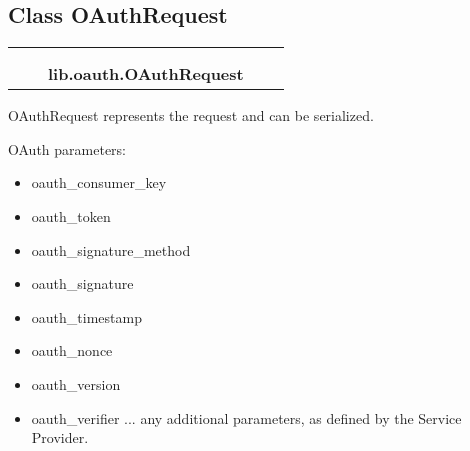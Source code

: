 

\subsection{Class OAuthRequest}

    \label{lib:oauth:OAuthRequest}
\begin{tabular}{cccccc}
\multicolumn{2}{r}{\settowidth{\BCL}{object}\multirow{2}{\BCL}{object}}
&&
  \\\cline{3-3}
  &&\multicolumn{1}{c|}{}
&&
  \\
&&\multicolumn{2}{l}{\textbf{lib.oauth.OAuthRequest}}
\end{tabular}

OAuthRequest represents the request and can be serialized.

OAuth parameters:

\begin{itemize}
\setlength{\parskip}{0.6ex}
  \item oauth\_consumer\_key

  \item oauth\_token

  \item oauth\_signature\_method

  \item oauth\_signature

  \item oauth\_timestamp

  \item oauth\_nonce

  \item oauth\_version

  \item oauth\_verifier ... any additional parameters, as defined by the 
    Service Provider.

\end{itemize}



